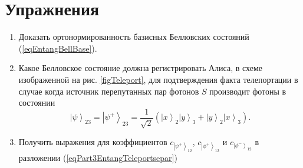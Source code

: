 %













\section{Упражнения}
\begin{enumerate}
\item Доказать ортонормированность базисных Белловских состояний
  (\ref{eqEntangBellBase}). 
\item Какое Белловское состояние должна регистрировать Алиса, в схеме
  изображенной на рис. \ref{figTeleport}, для
  подтверждения факта телепортации в случае когда источник
  перепутанных пар фотонов $S$ производит фотоны в состоянии 
\begin{equation}
  \left|\psi\right>_{23} = \left|\psi^{+}\right>_{23} = \frac{1}{\sqrt{2}}\left(
  \left|x\right>_2\left|y\right>_3 +
  \left|y\right>_2\left|x\right>_3
  \right).
  \nonumber
\end{equation}
\item Получить выражения для коэффициентов 
$c_{\left|\psi^{+}\right>_{12}}$, 
$c_{\left|\phi^{+}\right>_{12}}$ и 
$c_{\left|\phi^{-}\right>_{12}}$
в разложении (\ref{eqPart3EntangTeleportsepar})
\end{enumerate}
